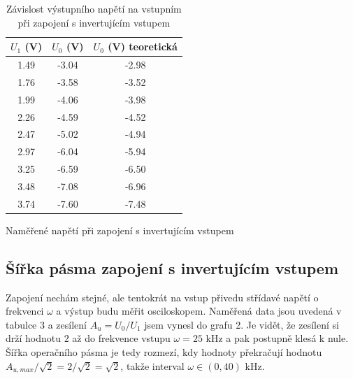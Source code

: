 \documentclass[a4paper,11pt]{article}
\begin{document}
\begin{table}[h]
    \begin{minipage}{.45\linewidth}
    \vspace{-15pt}
    \centering
    \begin{tabular}{| c c c | }
        \hline
        $ U_1 $ (V) & $ U_0 $ (V) & $ U_0 $ (V)  teoretická \\ \hline
        1.49 & -3.04 & -2.98 \\
        1.76 & -3.58 & -3.52 \\
        1.99 & -4.06 & -3.98 \\
        2.26 & -4.59 & -4.52 \\
        2.47 & -5.02 & -4.94 \\
        2.97 & -6.04 & -5.94 \\
        3.25 & -6.59 & -6.50 \\
        3.48 & -7.08 & -6.96 \\
        3.74 & -7.60 & -7.48 \\
        \hline
    \end{tabular}
    \caption{Naměřené napětí při zapojení s invertujícím vstupem}
    \end{minipage} 
    \hfill
    \begin{minipage}{.5\linewidth}
        \centering
        \resizebox{\textwidth}{!}{  }
        \captionsetup{type=graph}
        \caption{Závislost výstupního napětí na vstupním při zapojení s invertujícím vstupem}
    \end{minipage} 
\end{table}

\subsection{Šířka pásma zapojení s invertujícím vstupem}

Zapojení nechám stejné, ale tentokrát na vstup přivedu střídavé napětí o frekvenci $ \omega $ a výstup budu měřit osciloskopem. Naměřená data jsou uvedená v tabulce 3 a zesílení $ A_u = U_0 / U_1 $ jsem vynesl do grafu 2. Je vidět, že zesílení si drží hodnotu $ 2 $ až do frekvence vstupu $ \omega = 25 $ kHz a pak postupně klesá k nule. Šířka operačního pásma je tedy rozmezí, kdy hodnoty překračují hodnotu $ A_{u,max} / \sqrt{2} = 2 / \sqrt{2} = \sqrt{2}    $, takže interval $ \omega \in (0, 40) $   kHz.

\newpage
\end{document}
